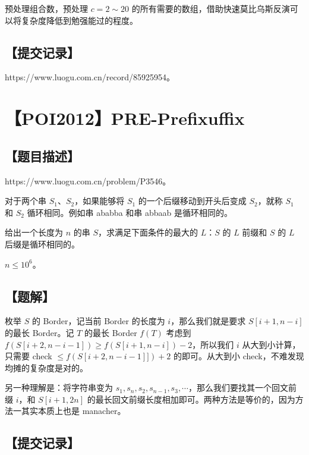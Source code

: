 \documentclass[UTF8,12pt,a4paper]{ctexart}
\begin{document}
	预处理组合数，预处理 $c=2\sim 20$ 的所有需要的数组，借助快速莫比乌斯反演可以将复杂度降低到勉强能过的程度。
	
	
	\subsection*{【提交记录】}
	
	https://www.luogu.com.cn/record/85925954。
	
	
	\section*{【POI2012】PRE-Prefixuffix}
	
	\subsection*{【题目描述】}
	
	https://www.luogu.com.cn/problem/P3546。
	
	对于两个串 $S_1$、$S_2$，如果能够将 $S_1$ 的一个后缀移动到开头后变成 $S_2$，就称 $S_1$ 和 $S_2$ 循环相同。例如串 ababba 和串 abbaab 是循环相同的。
	
	给出一个长度为 $n$ 的串 $S$，求满足下面条件的最大的 $L$：$S$ 的 $L$ 前缀和 $S$ 的 $L$ 后缀是循环相同的。
	
	$n\le 10^6$。
	
	\subsection*{【题解】}
	
	枚举 $S$ 的 Border，记当前 Border 的长度为 $i$，那么我们就是要求 $S[i+1,n-i]$ 的最长 Border。记 $T$ 的最长 Border $f(T)$ 考虑到 $f(S[i+2,n-i-1])\ge f(S[i+1,n-i])-2$，所以我们 $i$ 从大到小计算，只需要 check $\le f(S[i+2,n-i-1]])+2$ 的即可。从大到小 check，不难发现均摊的复杂度是对的。
	
	另一种理解是：将字符串变为 $s_1,s_n,s_2,s_{n-1},s_3,\cdots$，那么我们要找其一个回文前缀 $i$，和 $S[i+1,2n]$ 的最长回文前缀长度相加即可。两种方法是等价的，因为方法一其实本质上也是 manacher。
	
	
	\subsection*{【提交记录】}
	
\end{document}
